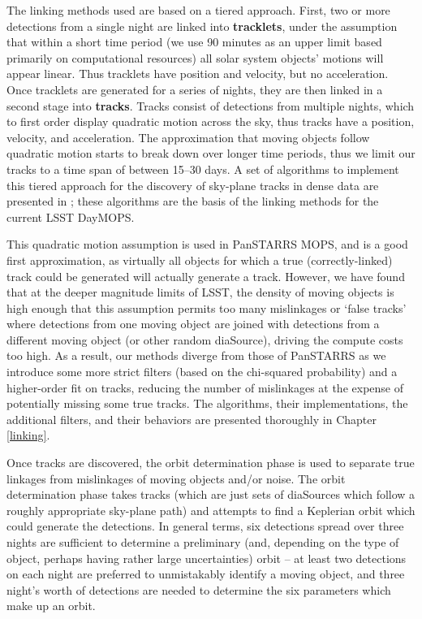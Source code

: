 The linking methods used are based on a tiered approach. First, two or
more detections from a single night are linked into
\textbf{tracklets}, under the assumption that within a short time
period (we use 90 minutes as an upper limit based primarily
on computational resources) all solar system objects'
motions will appear linear. Thus tracklets have position and velocity,
but no acceleration. Once tracklets are generated for a series of
nights, they are then linked in a second stage into
\textbf{tracks}. Tracks consist of detections from multiple nights,
which to first order display quadratic motion across the sky, thus tracks have a position,
velocity, and acceleration. The approximation that moving objects
follow quadratic motion starts to break down over longer time periods,
thus we limit our tracks to a time span of between 15--30 days.  A set
of algorithms to implement this tiered approach for the discovery of
sky-plane tracks in dense data are presented in
\citet{Kubica:2005:MTA:1081870.1081889}; these algorithms are the
basis of the linking methods for the current LSST DayMOPS.

This quadratic motion assumption is used in PanSTARRS MOPS, and is a
good first approximation, as virtually all objects for which a true
(correctly-linked) track could be generated will actually generate a
track. However, we have found that at the deeper magnitude limits of
LSST, the density of moving objects is high enough that this
assumption permits too many mislinkages or `false tracks' where
detections from one moving object are joined with detections from a
different moving object (or other random diaSource), driving the
compute costs too high. As a result, our methods diverge from those of
PanSTARRS as we introduce some more strict filters (based on the
chi-squared probability) and a higher-order
fit on tracks, reducing the number of mislinkages at the expense of
potentially missing some true tracks.  The algorithms, their
implementations, the additional filters, and their behaviors are
presented thoroughly in Chapter \ref{linking}.

Once tracks are discovered, the orbit determination phase is used to
separate true linkages from mislinkages of moving objects and/or
noise. The orbit determination phase takes tracks (which are just sets
of diaSources which follow a roughly appropriate sky-plane path) and
attempts to find a Keplerian orbit which could generate the
detections. In general terms, six detections spread over three nights
are sufficient to determine a preliminary (and, depending on the type
of object, perhaps having rather large uncertainties) orbit -- at
least two detections on each night are preferred to unmistakably
identify a moving object, and three night's worth of detections are
needed to determine the six parameters which make up an orbit. 

